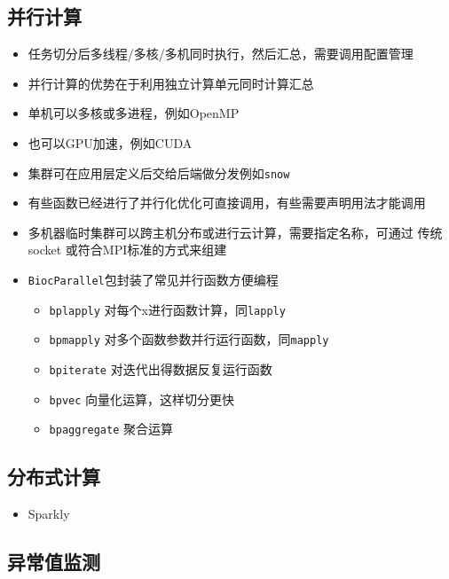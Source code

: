 \documentclass[
]{book}
\providecommand{\tightlist}{%
  \setlength{\itemsep}{0pt}\setlength{\parskip}{0pt}}
\begin{document}
\hypertarget{ux5e76ux884cux8ba1ux7b97}{%
\subsection{并行计算}\label{ux5e76ux884cux8ba1ux7b97}}

\begin{itemize}
\tightlist
\item
  任务切分后多线程/多核/多机同时执行，然后汇总，需要调用配置管理
\item
  并行计算的优势在于利用独立计算单元同时计算汇总
\item
  单机可以多核或多进程，例如OpenMP
\item
  也可以GPU加速，例如CUDA
\item
  集群可在应用层定义后交给后端做分发例如\texttt{snow}
\item
  有些函数已经进行了并行化优化可直接调用，有些需要声明用法才能调用
\item
  多机器临时集群可以跨主机分布或进行云计算，需要指定名称，可通过 传统 socket 或符合MPI标准的方式来组建
\item
  \texttt{BiocParallel}包封装了常见并行函数方便编程

  \begin{itemize}
  \tightlist
  \item
    \texttt{bplapply} 对每个x进行函数计算，同\texttt{lapply}
  \item
    \texttt{bpmapply} 对多个函数参数并行运行函数，同\texttt{mapply}
  \item
    \texttt{bpiterate} 对迭代出得数据反复运行函数
  \item
    \texttt{bpvec} 向量化运算，这样切分更快
  \item
    \texttt{bpaggregate} 聚合运算
  \end{itemize}
\end{itemize}

\hypertarget{ux5206ux5e03ux5f0fux8ba1ux7b97}{%
\subsection{分布式计算}\label{ux5206ux5e03ux5f0fux8ba1ux7b97}}

\begin{itemize}
\tightlist
\item
  Sparkly
\end{itemize}

\hypertarget{ux5f02ux5e38ux503cux76d1ux6d4b}{%
\subsection{异常值监测}\label{ux5f02ux5e38ux503cux76d1ux6d4b}}
\end{document}
